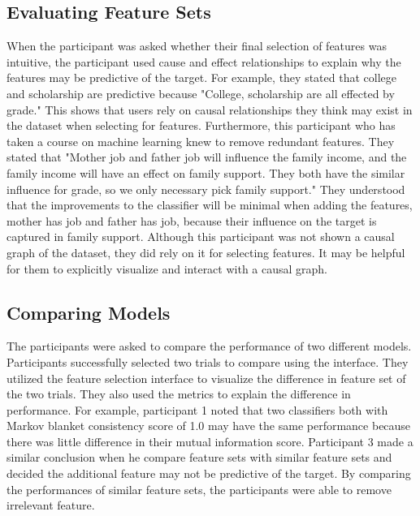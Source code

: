 \subsection{Evaluating Feature Sets}

When the participant was asked whether their final selection of features was intuitive, the participant used cause and effect relationships to explain why the features may be predictive of the target. For example, they stated that college and scholarship are predictive because "College, scholarship are all effected by grade." This shows that users rely on causal relationships they think may exist in the dataset when selecting for features. Furthermore, this participant who has taken a course on machine learning knew to remove redundant features. They stated that "Mother job and father job will influence the family income, and the family income will have an effect on family support.  They both have the similar influence for grade, so we only necessary pick family support." They understood that the improvements to the classifier will be minimal when adding the features, mother has job and father has job, because their influence on the target is captured in family support. Although this participant was not shown a causal graph of the dataset, they did rely on it for selecting features. It may be helpful for them to explicitly visualize and interact with a causal graph.


\subsection { Comparing Models }
The participants were asked to compare the performance of two different models. Participants successfully selected two trials to compare using the interface. They utilized the feature selection interface to visualize the difference in feature set of the two trials. They also used the metrics to explain the difference in performance. For example, participant 1 noted that two classifiers both with Markov blanket consistency score of 1.0 may have the same performance because there was little difference in their mutual information score. Participant 3 made a similar conclusion when he compare feature sets with similar feature sets and decided the additional feature may not be predictive of the target. By comparing the performances of similar feature sets, the participants were able to remove irrelevant feature.
